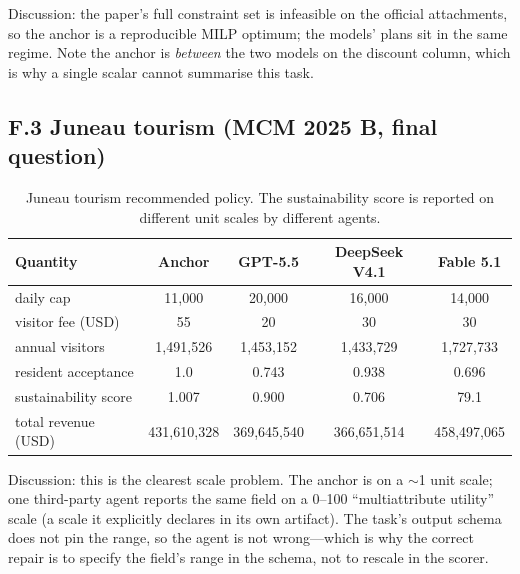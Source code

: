 Discussion: the paper's full constraint set is infeasible on the official
attachments, so the anchor is a reproducible MILP optimum; the models' plans sit
in the same regime. Note the anchor is \emph{between} the two models on the
discount column, which is why a single scalar cannot summarise this task.

\subsection{F.3 Juneau tourism (MCM 2025 B, final question)}
\begin{table}[h]
\centering
\small
\caption{Juneau tourism recommended policy. The sustainability score is reported on different unit scales by different agents.}
\label{tab:case-juneau}
\begin{tabular}{@{}lcccc@{}}
\toprule
Quantity & Anchor & GPT-5.5 & DeepSeek V4.1 & Fable 5.1 \\
\midrule
daily cap            & 11{,}000 & 20{,}000 & 16{,}000 & 14{,}000 \\
visitor fee (USD)    & 55       & 20       & 30       & 30 \\
annual visitors      & 1{,}491{,}526 & 1{,}453{,}152 & 1{,}433{,}729 & 1{,}727{,}733 \\
resident acceptance  & 1.0      & 0.743    & 0.938    & 0.696 \\
sustainability score & 1.007    & 0.900    & 0.706    & 79.1 \\
total revenue (USD)  & 431{,}610{,}328 & 369{,}645{,}540 & 366{,}651{,}514 & 458{,}497{,}065 \\
\bottomrule
\end{tabular}
\end{table}

Discussion: this is the clearest scale problem. The anchor is on a $\sim$1 unit
scale; one third-party agent reports the same field on a 0--100 ``multiattribute
utility'' scale (a scale it explicitly declares in its own artifact). The task's
output schema does not pin the range, so the agent is not wrong---which is why the
correct repair is to specify the field's range in the schema, not to rescale in
the scorer.
